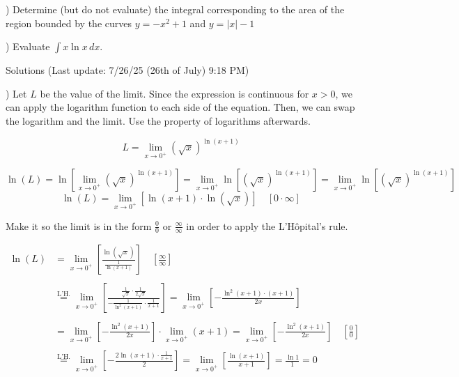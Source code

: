 \documentclass{article}
\begin{document}
) Determine (but do not evaluate) the integral corresponding to the area of the region bounded by the curves $y = -x^2 + 1$ and $y = |x|- 1$

\hfill

) Evaluate $\displaystyle \int x\ln x \, dx$.

\hfill

\newpage

\begin{center}
Solutions (Last update: 7/26/25 (26th of July) 9:18 PM)
\end{center}

) Let $L$ be the value of the limit. Since the expression is continuous for $x>0$, we can apply the logarithm function to each side of the equation. Then, we can swap the logarithm and the limit. Use the property of logarithms afterwards.

\begin{equation*}L=\lim_{x\to0^+} \left(\sqrt x\right)^{\ln\left(x+1\right)}\end{equation*}

\begin{equation*}\ln(L)=\ln\left[\lim_{x\to0^+} \left(\sqrt x\right)^{\ln\left(x+1\right)}\right] = \lim_{x\to0^+} \ln\left[\left(\sqrt x\right)^{\ln\left(x+1\right)}\right] = \lim_{x\to0^+} \ln\left[\left(\sqrt x\right)^{\ln\left(x+1\right)}\right] \end{equation*}
\begin{equation*}\ln\left(L\right) = \lim_{x\to0^+} \left[\ln\left(x+1\right)\cdot\ln\left(\sqrt x\right)\right] \quad\left[0\cdot\infty\right]\end{equation*}

\hfill

\noindent Make it so the limit is in the form $\displaystyle \frac00$ or $\displaystyle \frac\infty\infty$ in order to apply the L'Hôpital's rule.

\begin{align*}\ln\left(L\right) &= \lim_{x\to0^+} \left[\frac{\ln\left(\sqrt x\right)}{\frac1{\ln\left(x+1\right)}}\right] \quad\left[\frac\infty\infty\right]\\\\&\overset{\text{L'H.}}{=}\lim_{x\to0^+} \left[\frac{\frac1{\sqrt x}\cdot\frac1{2\sqrt x}}{-\frac1{\ln^2\left(x+1\right)}\cdot \frac1{x+1}}\right] = \lim_{x\to0^+} \left[-\frac{\ln^2(x+1)\cdot(x+1)}{2x}\right]\\\\&=\lim_{x\to0^+} \left[-\frac{\ln^2(x+1)}{2x}\right] \cdot\lim_{x\to0^+} \left(x+1\right)=\lim_{x\to0^+} \left[-\frac{\ln^2(x+1)}{2x}\right]\quad\left[\frac00\right]\\\\&\overset{\text{L'H.}}{=}\lim_{x\to0^+} \left[-\frac{2\ln(x+1) \cdot\frac1{x+1}}2\right]=\lim_{x\to0^+} \left[\frac{\ln(x+1)}{x+1}\right] = \frac{\ln1}{1}=0\end{align*}
\end{document}
